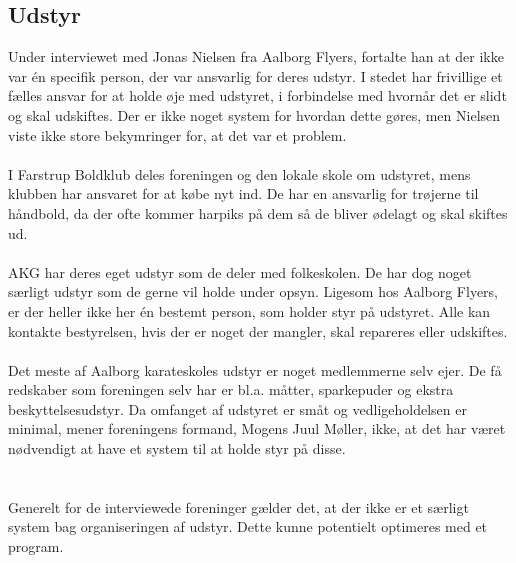 \subsection*{Udstyr}
Under interviewet med Jonas Nielsen fra Aalborg Flyers, fortalte han at der ikke var én specifik person, der var ansvarlig for deres udstyr. I stedet har frivillige et fælles ansvar for at holde øje med udstyret, i forbindelse med hvornår det er slidt og skal udskiftes. Der er ikke noget system for hvordan dette gøres, men Nielsen viste ikke store bekymringer for, at det var et problem.
\\\\
I Farstrup Boldklub deles foreningen og den lokale skole om udstyret, mens klubben har ansvaret for at købe nyt ind. De har en ansvarlig for trøjerne til håndbold, da der ofte kommer harpiks på dem så de bliver ødelagt og skal skiftes ud. 
\\\\
AKG har deres eget udstyr som de deler med folkeskolen. De har dog noget særligt udstyr som de gerne vil holde under opsyn. Ligesom hos Aalborg Flyers, er der heller ikke her én bestemt person, som holder styr på udstyret. Alle kan kontakte bestyrelsen, hvis der er noget der mangler, skal repareres eller udskiftes. 
\\\\
Det meste af Aalborg karateskoles udstyr er noget medlemmerne selv ejer. De få redskaber som foreningen selv har er bl.a. måtter, sparkepuder og ekstra beskyttelsesudstyr. Da omfanget af udstyret er småt og vedligeholdelsen er minimal, mener foreningens formand, Mogens Juul Møller, ikke, at det har været nødvendigt at have et system til at holde styr på disse.
\\\\\\
Generelt for de interviewede foreninger gælder det, at der ikke er et særligt system bag organiseringen af udstyr. Dette kunne potentielt optimeres med et program. 

